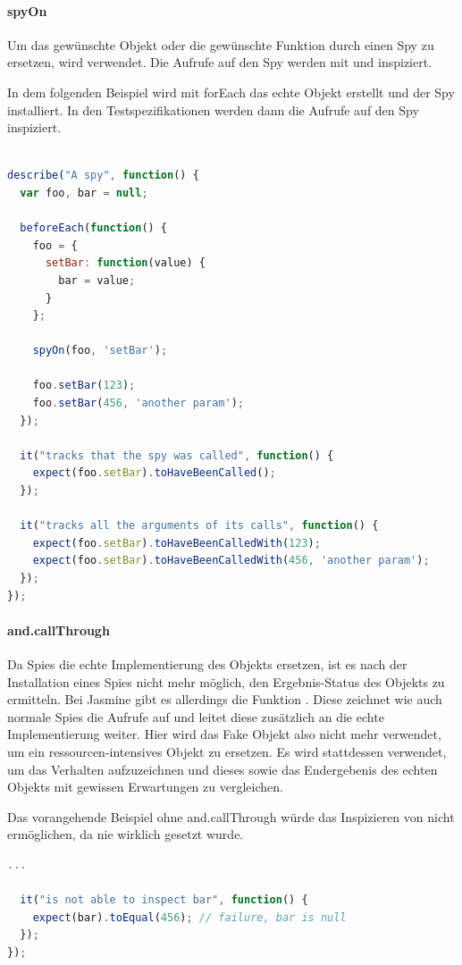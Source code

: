 \paragraph{spyOn}
Um das gewünschte Objekt oder die gewünschte Funktion durch einen Spy zu ersetzen, wird  verwendet. Die Aufrufe auf den Spy werden mit  und  inspiziert.

In dem folgenden Beispiel wird mit forEach das echte Objekt erstellt und der Spy installiert. In den Testspezifikationen werden dann die Aufrufe auf den Spy inspiziert.

\begin{lstlisting}[language=JavaScript]

describe("A spy", function() {
  var foo, bar = null;

  beforeEach(function() {
    foo = {
      setBar: function(value) {
        bar = value;
      }
    };

    spyOn(foo, 'setBar');

    foo.setBar(123);
    foo.setBar(456, 'another param');
  });

  it("tracks that the spy was called", function() {
    expect(foo.setBar).toHaveBeenCalled();
  });

  it("tracks all the arguments of its calls", function() {
    expect(foo.setBar).toHaveBeenCalledWith(123);
    expect(foo.setBar).toHaveBeenCalledWith(456, 'another param');
  });
});

\end{lstlisting}

\paragraph{and.callThrough}
Da Spies die echte Implementierung des Objekts ersetzen, ist es nach der Installation eines Spies nicht mehr möglich, den Ergebnis-Status des Objekts zu ermitteln. Bei Jasmine gibt es allerdings die Funktion . Diese zeichnet wie auch normale Spies die Aufrufe auf und leitet diese zusätzlich an die echte Implementierung weiter. Hier wird das Fake Objekt also nicht mehr verwendet, um ein ressourcen-intensives Objekt zu ersetzen. Es wird stattdessen verwendet, um das Verhalten aufzuzeichnen und dieses sowie das Endergebenis des echten Objekts mit gewissen Erwartungen zu vergleichen.

Das vorangehende Beispiel ohne and.callThrough würde das Inspizieren von  nicht ermöglichen, da  nie wirklich gesetzt wurde.
\begin{lstlisting}[language=JavaScript]
  ...

  it("is not able to inspect bar", function() {
    expect(bar).toEqual(456); // failure, bar is null
  });
});
\end{lstlisting}

